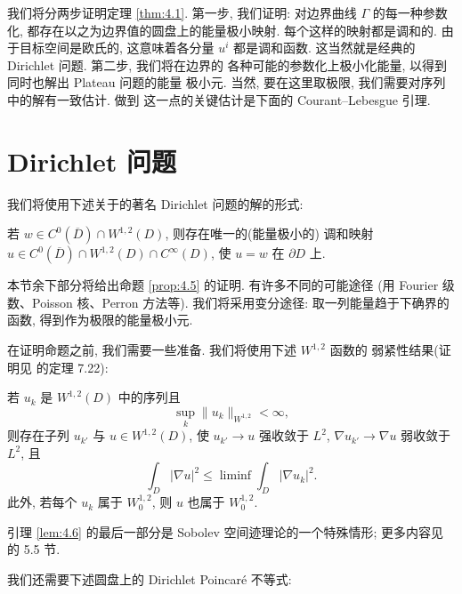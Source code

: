 我们将分两步证明定理 \ref{thm:4.1}. 第一步, 我们证明: 对边界曲线
$\Gamma$ 的每一种参数化, 都存在以之为边界值的圆盘上的能量极小映射.
每个这样的映射都是调和的. 由于目标空间是欧氏的, 这意味着各分量 $u^i$
都是调和函数. 这当然就是经典的 Dirichlet 问题. 第二步, 我们将在边界的
各种可能的参数化上极小化能量, 以得到同时也解出 Plateau 问题的能量
极小元. 当然, 要在这里取极限, 我们需要对序列中的解有一致估计. 做到
这一点的关键估计是下面的 Courant--Lebesgue 引理.

\section{Dirichlet 问题}
\label{sec:4.2}

我们将使用下述关于的著名 Dirichlet 问题的解的形式:

\begin{proposition}
\label{prop:4.5}
若 $w\in C^0(\overline{D})\cap W^{1,2}(D)$, 则存在唯一的(能量极小的)
调和映射 $u\in C^0(\overline{D})\cap W^{1,2}(D)\cap C^\infty(D)$, 使
$u=w$ 在 $\partial D$ 上.
\end{proposition}

本节余下部分将给出命题 \ref{prop:4.5} 的证明. 有许多不同的可能途径
(用 Fourier 级数、Poisson 核、Perron 方法等). 我们将采用变分途径:
取一列能量趋于下确界的函数, 得到作为极限的能量极小元.

在证明命题之前, 我们需要一些准备. 我们将使用下述 $W^{1,2}$ 函数的
弱紧性结果(证明见 \cite{GiTr} 的定理 7.22):

\begin{lemma}[Rellich 紧性]
\label{lem:4.6}
若 $u_k$ 是 $W^{1,2}(D)$ 中的序列且
\begin{equation*}
\sup_k\|u_k\|_{W^{1,2}}<\infty,
\end{equation*}
则存在子列 $u_{k'}$ 与 $u\in W^{1,2}(D)$, 使 $u_{k'}\to u$ 强收敛于
$L^2$, $\nabla u_{k'}\to\nabla u$ 弱收敛于 $L^2$, 且
\begin{equation}
\int_D|\nabla u|^2\leq\liminf\int_D|\nabla u_k|^2.
\label{eq:4.7}
\end{equation}
此外, 若每个 $u_k$ 属于 $W_0^{1,2}$, 则 $u$ 也属于 $W_0^{1,2}$.
\end{lemma}

引理 \ref{lem:4.6} 的最后一部分是 Sobolev 空间迹理论的一个特殊情形;
更多内容见 \cite{Ev} 的 5.5 节.

我们还需要下述圆盘上的 Dirichlet Poincar\'e 不等式:

